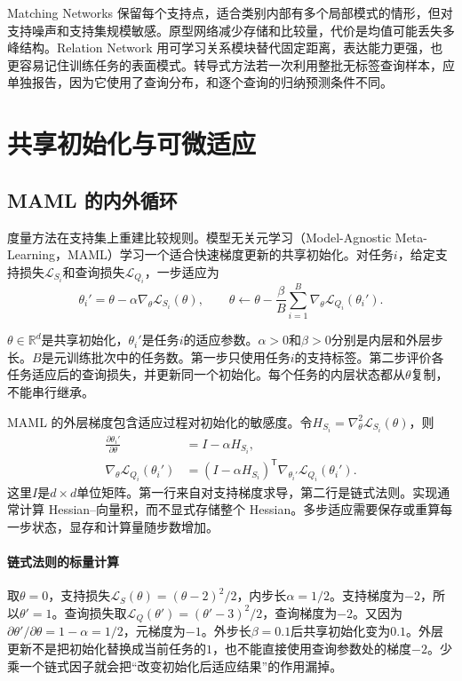 Matching Networks 保留每个支持点，适合类别内部有多个局部模式的情形，但对支持噪声和支持集规模敏感。原型网络减少存储和比较量，代价是均值可能丢失多峰结构。Relation Network 用可学习关系模块替代固定距离\cite{sung2018relation}，表达能力更强，也更容易记住训练任务的表面模式。转导式方法若一次利用整批无标签查询样本，应单独报告，因为它使用了查询分布，和逐个查询的归纳预测条件不同。

\section{共享初始化与可微适应}

\subsection{MAML 的内外循环}

度量方法在支持集上重建比较规则。模型无关元学习（Model-Agnostic Meta-Learning，MAML）学习一个适合快速梯度更新的共享初始化\cite{finn2017maml}。对任务$i$，给定支持损失$\mathcal L_{S_i}$和查询损失$\mathcal L_{Q_i}$，一步适应为
\begin{equation}
\theta_i'=\theta-\alpha\nabla_\theta\mathcal L_{S_i}(\theta),
\qquad
\theta\leftarrow\theta-\frac{\beta}{B}\sum_{i=1}^{B}
\nabla_\theta\mathcal L_{Q_i}(\theta_i').
\label{eq:meta-maml-update}
\end{equation}

$\theta\in\mathbb R^d$是共享初始化，$\theta_i'$是任务$i$的适应参数。$\alpha>0$和$\beta>0$分别是内层和外层步长。$B$是元训练批次中的任务数。第一步只使用任务$i$的支持标签。第二步评价各任务适应后的查询损失，并更新同一个初始化。每个任务的内层状态都从$\theta$复制，不能串行继承。

MAML 的外层梯度包含适应过程对初始化的敏感度。令$H_{S_i}=\nabla_\theta^2\mathcal L_{S_i}(\theta)$，则
\begin{align}
\frac{\partial\theta_i'}{\partial\theta}&=I-\alpha H_{S_i},\\
\nabla_\theta\mathcal L_{Q_i}(\theta_i')
&=(I-\alpha H_{S_i})^{\mathsf T}
\nabla_{\theta_i'}\mathcal L_{Q_i}(\theta_i').
\label{eq:meta-maml-chain-rule}
\end{align}
这里$I$是$d\times d$单位矩阵。第一行来自对支持梯度求导，第二行是链式法则。实现通常计算 Hessian--向量积，而不显式存储整个 Hessian。多步适应需要保存或重算每一步状态，显存和计算量随步数增加。

\paragraph{链式法则的标量计算}
取$\theta=0$，支持损失$\mathcal L_S(\theta)=(\theta-2)^2/2$，内步长$\alpha=1/2$。支持梯度为$-2$，所以$\theta'=1$。查询损失取$\mathcal L_Q(\theta')=(\theta'-3)^2/2$，查询梯度为$-2$。又因为$\partial\theta'/\partial\theta=1-\alpha=1/2$，元梯度为$-1$。外步长$\beta=0.1$后共享初始化变为$0.1$。外层更新不是把初始化替换成当前任务的$1$，也不能直接使用查询参数处的梯度$-2$。少乘一个链式因子就会把“改变初始化后适应结果”的作用漏掉。

